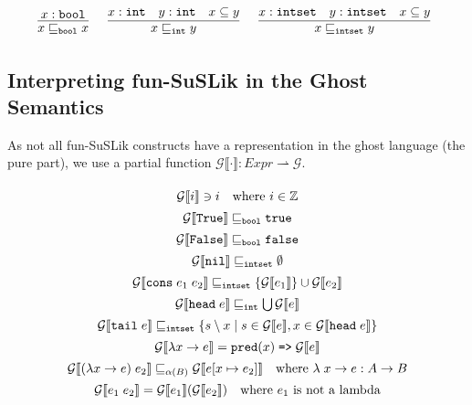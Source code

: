 \documentclass[10pt]{article}
\newcommand{\ttt}[1]{\texttt{#1}}
\newcommand{\ra}{\ensuremath{\rightarrow}}
\newcommand{\True}{\ttt{True}}
\newcommand{\False}{\ttt{False}}
\newcommand{\head}{\ttt{head}}
\newcommand{\tail}{\ttt{tail}}
\newcommand{\cons}{\ttt{cons}}
\newcommand{\nil}{\ttt{nil}}
\newcommand{\foldr}{\ttt{foldr}}
\newcommand{\intS}{\ttt{int}}
\newcommand{\intset}{\ttt{intset}}
\newcommand{\bool}{\ttt{bool}}
\newcommand{\pred}{\ttt{pred}}
\newcommand{\true}{\ttt{true}}
\newcommand{\false}{\ttt{false}}
\newcommand{\labinfer} [3] [] {\infer[{\small\textsc{#1}}]{#2}{#3}}
\newcommand{\sem} [1] {\llbracket#1\rrbracket}
\newcommand{\Gsem} [1] {\mathcal{G}\sem{#1}}
\newcommand{\partialfn} {\rightharpoonup}
\newcommand{\sqle} [1] {\sqsubseteq_{#1}}
\newcommand{\boolLE} {\sqle{\bool}}
\newcommand{\intLE} {\sqle{\intS}}
\newcommand{\intsetLE} {\sqle{\intset}}
\begin{document}
\[
  \begin{array}{cc}
    \labinfer{x \boolLE x}{x : \bool}
    ~~~
    \labinfer{x \intLE y}{x : \intS & y : \intS & x \subseteq y}
    ~~~
    \labinfer{x \intsetLE y}{x : \intset & y : \intset & x \subseteq y}
  \end{array}
\]

\subsection{Interpreting fun-SuSLik in the Ghost Semantics}

%
%

As not all fun-SuSLik constructs have a representation in the ghost language (the pure part),
we use a partial function $\Gsem{\cdot} : Expr \partialfn \mathcal{G}$.

\[\arraycolsep=1.4pt\def\arraystretch{1.4}
  \begin{array}{c}
    \Gsem{i} \ni i~~~\text{where $i \in \mathbb{Z}$}
    \\
    \Gsem{\True} \boolLE \true
    \\
    \Gsem{\False} \boolLE \false
    \\
    \Gsem{\nil} \intsetLE \emptyset
    \\
    \Gsem{\cons\; e_1\; e_2} \intsetLE \{ \Gsem{e_1} \} \cup \Gsem{e_2}
    \\
    \Gsem{\head\; e} \intLE \bigcup\Gsem{e}
    \\
    \Gsem{\tail\; e} \intsetLE \{ s \setminus x\; |\; s \in \Gsem{e}, x \in \Gsem{\head\; e}\}
    \\
    \Gsem{\lambda x \ra e} = \pred(x)\; \ttt{=>}\; \Gsem{e}
    \\
    \Gsem{(\lambda x \ra e)\; e_2} \sqle{\alpha(B)} \Gsem{e[x\mapsto e_2]}~~~\text{where $\lambda\; x \ra e : A \ra B$}
    \\
    \Gsem{e_1\; e_2} = \Gsem{e_1}(\Gsem{e_2})~~~\text{where $e_1$ is not a lambda}
  \end{array}
\]
\end{document}
